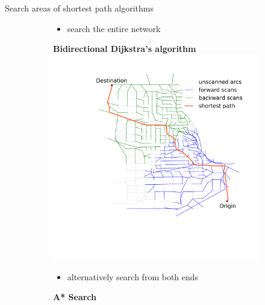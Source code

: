 \documentclass[final]{beamer}
\begin{document}
\begin{frame}{ }
\begin{columns}[t]
\begin{column}{.4\linewidth}
\begin{block}{Search areas of shortest path algorithms \vspace{-.2em}}
\begin{figure}
\begin{subfigure}{.5\linewidth}
\begin{itemize}
                            \centering
                        \item search the entire network
                    \end{itemize}
                \end{subfigure}%
                \begin{subfigure}{.5\linewidth}
                    \vspace{.1em}
                    \centering
                    {\bfseries Bidirectional Dijkstra's algorithm}
                    \includegraphics[width=\linewidth,trim=120px 280px 48px 60px,clip]{img/dijkstra_bidirect}
                    \begin{itemize}
                            \centering
                        \item alternatively search from both ends
                    \end{itemize}
                \end{subfigure}
                \begin{subfigure}{.5\linewidth}
                    \centering
                    {\bfseries A* Search}

\end{subfigure}
\end{figure}
\end{block}
\end{column}
\end{columns}
\end{frame}
\end{document}
